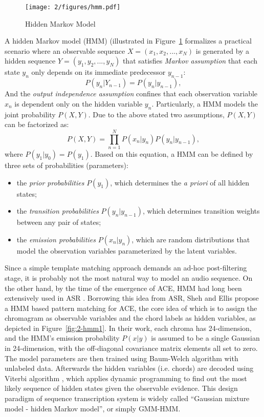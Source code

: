 \begin{figure}[htb]
\centering
\texttt{[image: 2/figures/hmm.pdf]}
\caption{Hidden Markov Model}
\label{fig:2-hmm}
\end{figure}
A hidden Markov model (HMM) (illustrated in Figure~\ref{fig:2-hmm} formalizes a practical scenario where an observable sequence $X=(x_1,x_2,...,x_N)$ is generated by a hidden sequence $Y = (y_1,y_2,...,y_N)$ that satisfies {\it Markov assumption} \cite{gardiner1985handbook} that each state $y_n$ only depends on its immediate predecessor $y_{n-1}$:
\begin{equation}\label{eq:2-mp}
P(y_n|Y_{n-1}) = P(y_n|y_{n-1}),
\end{equation}
And the {\it output independence assumption} confines that each observation variable $x_n$ is dependent only on the hidden variable $y_n$. Particularly, a HMM models the joint probability $P(X,Y)$. Due to the above stated two assumptions, $P(X,Y)$ can be factorized as:
\begin{equation}\label{eq:2-hmm}
P(X,Y) = \prod_{n=1}^N P(x_n|y_n)P(y_n|y_{n-1}),
\end{equation}
where $P(y_1|y_0)=P(y_1)$. Based on this equation, a HMM can be defined by three sets of probabilities (parameters):
\begin{itemize}
\item the {\it prior probabilities} $P(y_1)$, which determines the {\it a priori} of all hidden states;
\item the {\it transition probabilities} $P(y_n|y_{n-1})$, which determines transition weights between any pair of states;
\item the {\it emission probabilities} $P(x_n|y_n)$, which are random distributions that model the observation variables parameterized by the latent variables.
\end{itemize}
Since a simple template matching approach demands an ad-hoc post-filtering stage, it is probably not the most natural way to model an audio sequence. On the other hand, by the time of the emergence of ACE, HMM had long been extensively used in ASR \cite{rabiner1989tutorial,huang1990hidden}. Borrowing this idea from ASR, Sheh and Ellis \cite{sheh2003chord} propose a HMM based pattern matching for ACE, the core idea of which is to assign the chromagram as observable variables and the chord labels as hidden variables, as depicted in Figure~\ref{fig:2-hmm1}. In their work, each chroma has 24-dimension, and the HMM's emission probability $P(x|y)$ is assumed to be a single Gaussian in 24-dimension, with the off-diagonal covariance matrix elements all set to zero. The model parameters are then trained using Baum-Welch algorithm \cite{baum1970maximization} with unlabeled data. Afterwards the hidden variables (i.e. chords) are decoded using Viterbi algorithm \cite{rabiner1989tutorial}, which applies dynamic programming to find out the most likely sequence of hidden states given the observable evidence. This design paradigm of sequence transcription system is widely called ``Gaussian mixture model - hidden Markov model'', or simply GMM-HMM.
